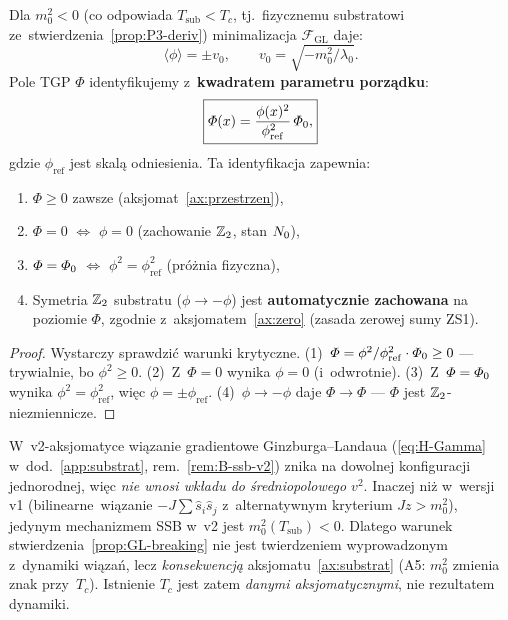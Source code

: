 \begin{proposition}%
\label{prop:GL-breaking}
Dla $m_0^2 < 0$ (co odpowiada $T_{\mathrm{sub}} < T_c$,
tj.\ fizycznemu substratowi ze~stwierdzenia~\ref{prop:P3-deriv})
minimalizacja $\mathcal{F}_{\mathrm{GL}}$ daje:
\begin{equation}\label{eq:GL-vev}
  \langle\phi\rangle = \pm v_0, \qquad
  v_0 = \sqrt{-m_0^2/\lambda_0}.
\end{equation}
Pole TGP $\Phi$ identyfikujemy z~\textbf{kwadratem
parametru porz\k{a}dku}:
\begin{equation}\label{eq:Phi-from-phi}
  \boxed{
    \varPhi(x) = \frac{\phi(x)^2}{\phi_{\mathrm{ref}}^2}\,\varPhi_0,
  }
\end{equation}
gdzie $\phi_{\mathrm{ref}}$ jest skal\k{a} odniesienia.
Ta identyfikacja zapewnia:
\begin{enumerate}[nosep]
  \item $\Phi \geq 0$ zawsze (aksjomat~\ref{ax:przestrzen}),
  \item $\Phi = 0$ $\Leftrightarrow$ $\phi = 0$
    (zachowanie $\mathbb{Z}_2$, stan $N_0$),
  \item $\varPhi = \varPhi_0$ $\Leftrightarrow$
    $\phi^2 = \phi_{\mathrm{ref}}^2$ (pr\'o\.znia fizyczna),
  \item Symetria $\mathbb{Z}_2$ substratu ($\phi \to -\phi$)
    jest \textbf{automatycznie zachowana} na poziomie $\Phi$,
    zgodnie z~aksjomatem~\ref{ax:zero} (zasada zerowej sumy ZS1).
\end{enumerate}
\end{proposition}

\begin{proof}
Wystarczy sprawdzi\'c warunki krytyczne.
(1)~$\varPhi = \phi^2/\phi_{\mathrm{ref}}^2 \cdot \varPhi_0 \geq 0$
--- trywialnie, bo $\phi^2 \geq 0$.
(2)~Z~$\Phi = 0$ wynika $\phi = 0$ (i~odwrotnie).
(3)~Z~$\varPhi = \varPhi_0$ wynika $\phi^2 = \phi_{\mathrm{ref}}^2$,
wi\k{e}c $\phi = \pm\phi_{\mathrm{ref}}$.
(4)~$\phi \to -\phi$ daje $\Phi \to \Phi$ ---
$\Phi$ jest $\mathbb{Z}_2$-niezmiennicze.
\end{proof}

\begin{remark}
\label{rem:GL-breaking-axiomatic}
W~v2-aksjomatyce wi\k{a}zanie gradientowe Ginzburga--Landaua
(\eqref{eq:H-Gamma} w~dod.~\ref{app:substrat},
rem.~\ref{rem:B-ssb-v2}) znika na dowolnej konfiguracji
jednorodnej, wi\k{e}c \emph{nie wnosi wk\l{}adu do
\'sredniopolowego $v^2$}. Inaczej ni\.z w~wersji v1
(bilinear\-ne~wi\k{a}zanie $-J\sum \hat{s}_i\hat{s}_j$
z~alternatywnym kryterium $Jz > m_0^2$), jedynym mechanizmem
SSB w~v2 jest $m_0^2(T_{\mathrm{sub}}) < 0$. Dlatego warunek
stwierdzenia~\ref{prop:GL-breaking} nie jest twierdzeniem
wyprowadzonym z~dynamiki wi\k{a}za\'n, lecz \emph{konsekwencj\k{a}}
aksjomatu~\ref{ax:substrat} (A5: $m_0^2$ zmienia znak
przy~$T_c$). Istnienie $T_c$ jest zatem \emph{danymi
aksjoma\-tycz\-nymi}, nie rezul\-ta\-tem dynamiki.
\end{remark}

